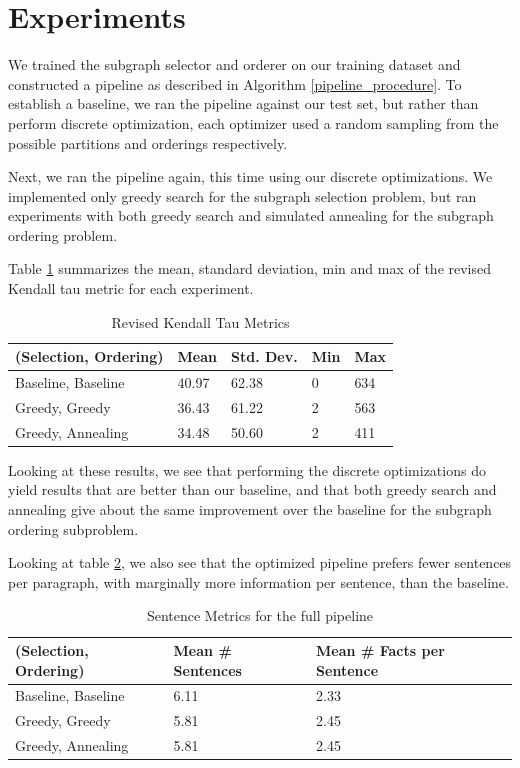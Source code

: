 \documentclass[12pt]{article}
\begin{document}
\section{Experiments}

We trained the subgraph selector and orderer on our training dataset and
constructed a pipeline as described in Algorithm \ref{pipeline_procedure}.
To establish a baseline, we ran the
pipeline against our test set, but rather than perform discrete optimization,
each optimizer used a random sampling from the possible partitions and 
orderings respectively.

Next, we ran the pipeline again, this time using our discrete optimizations.
We implemented only greedy search for the subgraph selection problem, but ran experiments with
both greedy search and simulated annealing for the subgraph ordering problem.

Table \ref{tab:experiments} summarizes the mean, standard deviation, min and max of the
revised Kendall tau metric for each experiment.

\begin{table}[H]
\centering
\caption{Revised Kendall Tau Metrics}
\label{tab:experiments}
\begin{tabular}{@{}lllll@{}}
\toprule
\textbf{(Selection, Ordering)} & \textbf{Mean} & \textbf{Std. Dev.} & \textbf{Min} & \textbf{Max} \\ \midrule
Baseline, Baseline & 40.97 & 62.38 & 0 & 634 \\
Greedy, Greedy & 36.43 & 61.22 & 2 & 563 \\
Greedy, Annealing & 34.48 & 50.60 & 2 & 411 \\ \bottomrule
\end{tabular}
\end{table}

Looking at these results, we see that performing the discrete optimizations do
yield results that are better than our baseline, and that both greedy search
and annealing give about the same improvement over the baseline for the
subgraph ordering subproblem.

Looking at table \ref{tab:metrics}, we also see that the optimized pipeline
prefers fewer sentences per paragraph, with marginally more information per
sentence, than the baseline.

\begin{table}[H]
\centering
\caption{Sentence Metrics for the full pipeline}
\label{tab:metrics}
\begin{tabular}{@{}lll@{}}
\toprule
\textbf{(Selection, Ordering)} & \textbf{Mean \# Sentences} & \textbf{Mean \# Facts per Sentence} \\ \midrule
Baseline, Baseline & 6.11 & 2.33 \\
Greedy, Greedy & 5.81 & 2.45\\
Greedy, Annealing & 5.81 & 2.45 \\ \bottomrule
\end{tabular}
\end{table}
\end{document}
